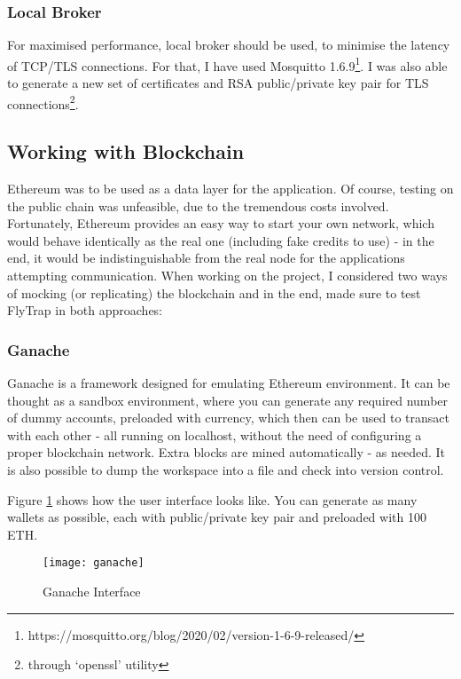 \subsubsection{Local Broker}
For maximised performance, local broker should be used, to minimise the latency of TCP/TLS connections. For that, I have used Mosquitto 1.6.9\footnote{https://mosquitto.org/blog/2020/02/version-1-6-9-released/}. I was also able to generate a new set of certificates and RSA public/private key pair for TLS connections\footnote{through `openssl' utility}.  
\subsection{Working with Blockchain}
Ethereum was to be used as a data layer for the application. Of course, testing on the public chain was unfeasible, due to the tremendous costs involved. Fortunately, Ethereum provides an easy way to start your own network, which would behave identically as the real one (including fake credits to use) - in the end, it would be indistinguishable from the real node for the applications attempting communication. When working on the project, I considered two ways of mocking (or replicating) the blockchain and in the end, made sure to test FlyTrap in both approaches:
\subsubsection{Ganache}
Ganache\cite{lee2019testing} is a framework designed for emulating Ethereum environment. It can be thought as a sandbox environment, where you can generate any required number of dummy accounts, preloaded with currency, which then can be used to transact with each other - all running on localhost, without the need of configuring a proper blockchain network. Extra blocks are mined automatically - as needed. It is also possible to dump the workspace into a file and check into version control.

Figure \ref{fig:ganache} shows how the user interface looks like. You can generate as many wallets as possible, each with public/private key pair and preloaded with 100 ETH.
\begin{figure}[h]
    \centering
    \texttt{[image: ganache]}
    \caption{Ganache Interface}
    \label{fig:ganache}
\end{figure}

